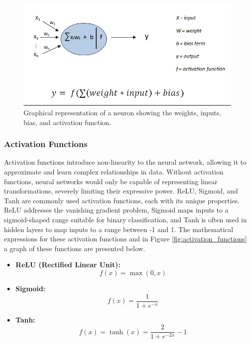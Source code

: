 \begin{figure}[htbp]
    \centering
    \includegraphics[width=\textwidth]{figures/weights_and_biases.png}
    \caption{Graphical representation of a neuron showing the weights, inputs, bias, and activation function.~\cite{yildirim2020activation}}
    \label{fig:neuron_math}
\end{figure}

\subsubsection*{Activation Functions}

Activation functions introduce non-linearity to the neural network, allowing it to approximate and learn complex relationships in data. Without activation functions, neural networks would only be capable of representing linear transformations, severely limiting their expressive power. ReLU, Sigmoid, and Tanh are commonly used activation functions, each with its unique properties. ReLU addresses the vanishing gradient problem, Sigmoid maps inputs to a sigmoid-shaped range suitable for binary classification, and Tanh is often used in hidden layers to map inputs to a range between -1 and 1. The mathematical expressions for these activation functions and in Figure \ref{fig:activation_functions} a graph of these functions are presented below.

\begin{itemize}
    \item \textbf{ReLU (Rectified Linear Unit):} 
    \[ f(x) = \max(0, x) \]
    
    \item \textbf{Sigmoid:} 
    \[ f(x) = \frac{1}{1 + e^{-x}} \]
    
    \item \textbf{Tanh:} 
    \[ f(x) = \tanh(x) = \frac{2}{1 + e^{-2x}} - 1 \]
\end{itemize}


